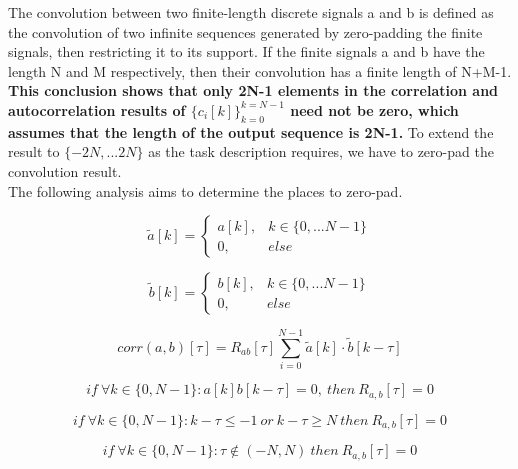 \documentclass{article}
\begin{document}
\par
The convolution between two finite-length discrete signals a and b is defined as the convolution of 
two infinite sequences generated by zero-padding the finite signals, then restricting it to its support.
If the finite signals a and b have the length N and M respectively, then their convolution has a finite length of N+M-1.
\\ \indent
\textbf{This conclusion shows that only 2N-1 elements in the correlation and autocorrelation results of $\{c_i[k]\}_{k=0}^{k=N-1}$ need not be zero, which 
assumes that the length of the output sequence is 2N-1.}
To extend the result to $\{-2N,...2N\}$ as the task description requires, 
we have to zero-pad the convolution result.
\\The following analysis aims to determine the places to zero-pad.

\begin{equation}
    \tilde{a}[k]=
    \begin{cases}
        a[k],& k\in \{0,...N-1\} \\
        0,&else
    \end{cases}
\end{equation}

\begin{equation}
    \tilde{b}[k]=
    \begin{cases}
        b[k],& k\in \{0,...N-1\} \\
        0,&else
    \end{cases}
\end{equation}

\begin{equation}
    corr(a,b)[\tau]=R_{ab}[\tau]\sum_{i=0}^{N-1}\tilde{a}[k]\cdot \tilde{b}[k-\tau]
\end{equation}

\begin{equation}
    if \ \forall k \in \{0,N-1\}: a[k]b[k-\tau]=0, \ then\ R_{a,b}[\tau]=0 
\end{equation}

\begin{equation}
    if \ \forall k \in \{0,N-1\}: k-\tau \leq -1\  or \ k-\tau \geq N\ then\ R_{a,b}[\tau]=0 
\end{equation}

\begin{equation}
    if \ \forall k \in \{0,N-1\}: \tau \notin (-N,N) \ then\ R_{a,b}[\tau]=0 
\end{equation}
\end{document}
